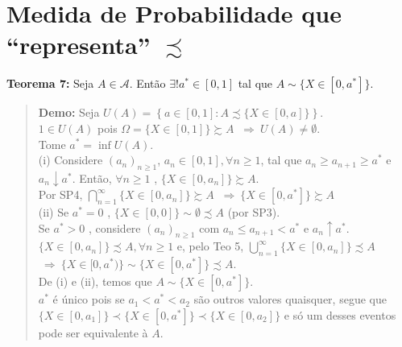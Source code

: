 \documentclass[
]{book}
\begin{document}
\(~\)

\hypertarget{medida-de-probabilidade-que-representa-precsim}{%
\section{\texorpdfstring{Medida de Probabilidade que ``representa'' \(\precsim\)}{Medida de Probabilidade que ``representa'' \textbackslash precsim}}\label{medida-de-probabilidade-que-representa-precsim}}

\textbf{Teorema 7:} Seja \(A \in \mathcal{A}\). Então \(\exists! a^* \in [0,1]\) tal que \(A \sim \{X \in [0,a^*]\}\).

\begin{quote}
\textbf{Demo:} Seja \(U(A) = \left\{ a \in [0,1] : A \precsim \{X \in [0,a]\} \right\}\).\\
\(1 \in U(A)\) pois \(\Omega = \{X \in [0,1]\} \succsim A\) \(~\Rightarrow~ U(A) \neq \emptyset\).\\
Tome \(a^* = \inf U(A)\).\\
\(~\)\\
(i) Considere \((a_n)_{n \geq 1}\), \(a_n \in [0,1], \forall n \geq 1\), tal que \(a_n \geq a_{n+1} \geq a^*\) e \(a_n \downarrow a^*\). Então, \(\forall n \geq 1\) , \(\{X \in [0,a_n]\} \succsim A\).\\
Por SP4, \(\displaystyle \bigcap_{n=1}^\infty \{X \in [0,a_n]\} \succsim A\) \(~\Rightarrow~ \{X \in [0,a^*]\} \succsim A\)\\
\(~\)\\
(ii) Se \(a^*=0\) , \(\{X \in [0,0]\} \sim \emptyset \precsim A\) (por SP3).\\
Se \(a^* > 0\) , considere \((a_n)_{n \geq 1}\) com \(a_n \leq a_{n+1} < a^*\) e \(a_n \uparrow a^*\).\\
\(\{X \in [0,a_n]\} \precsim A, \forall n \geq 1\) e, pelo Teo 5, \(\displaystyle \bigcup_{n=1}^{\infty} \{X \in [0,a_n]\} \precsim A\) \(~\Rightarrow~ \{X \in [0,a^*)\} \sim \{X \in [0,a^*]\} \precsim A\).\\
\(~\)\\
De (i) e (ii), temos que \(A \sim \{X \in [0,a^*]\}\).\\
\(~\)\\
\(a^*\) é único pois se \(a_1 < a^* < a_2\) são outros valores quaisquer, segue que \(\{X \in [0,a_1]\} \prec \{X \in [0,a^*]\} \prec \{X \in [0,a_2]\}\) e só um desses eventos pode ser equivalente à \(A\).
\end{quote}

\(~\)
\end{document}

